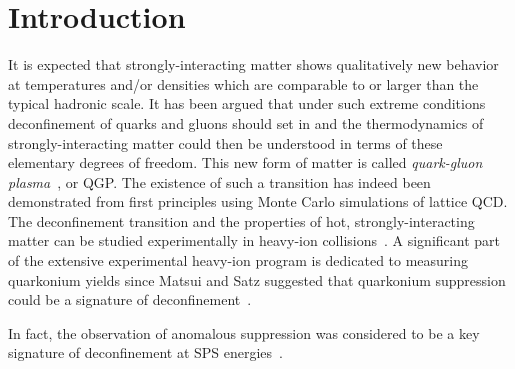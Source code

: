 \section{Introduction}
\label{sec:Introduction}
It is expected that strongly-interacting matter shows qualitatively
new behavior at temperatures and/or densities which are
comparable to or larger than the typical hadronic scale.
It has been argued that under such extreme conditions
deconfinement of quarks and gluons should set in and the 
thermodynamics of strongly-interacting matter could then
be understood in terms of these elementary degrees of freedom.
This new form of matter is called
{\em quark-gluon plasma}~\cite{Shuryak:1980tp,Satz:2011wf}, or QGP.
The existence of such a transition has indeed been demonstrated 
from first principles using Monte Carlo simulations of lattice QCD.
The deconfinement transition and the properties of hot, strongly-interacting 
matter can be studied experimentally in heavy-ion collisions~\cite{Satz:2000bn}. 
A significant part of the extensive experimental heavy-ion
program is dedicated to measuring quarkonium yields since Matsui and Satz
suggested that quarkonium suppression could be a signature of 
deconfinement~\cite{Matsui:1986dk}.

In fact, the observation of anomalous suppression was considered to be
a key signature of deconfinement at SPS energies~\cite{Kluberg:2005yh}.

